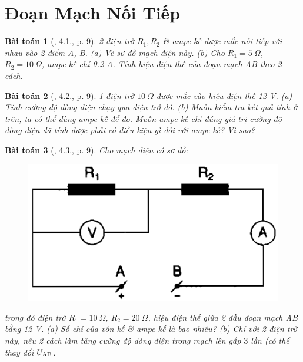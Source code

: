 \documentclass{article}
\newtheorem{baitoan}{Bài toán}
\begin{document}

\section{Đoạn Mạch Nối Tiếp}

\begin{baitoan}[\cite{SBT_Vat_Ly_9}, 4.1., p. 9]
	2 điện trở $R_1,R_2$ \& ampe kế được mắc nối tiếp với nhau vào 2 điểm A, B. (a) Vẽ sơ đồ mạch điện này. (b) Cho $R_1 = 5\ \Omega$, $R_2 = 10\ \Omega$, ampe kế chỉ \emph{0.2 A}. Tính hiệu điện thế của đoạn mạch AB theo 2 cách.
\end{baitoan}

\begin{baitoan}[\cite{SBT_Vat_Ly_9}, 4.2., p. 9]
	1 điện trở $10\ \Omega$ được mắc vào hiệu điện thế \emph{12 V}. (a) Tính cường độ dòng điện chạy qua điện trở đó. (b) Muốn kiểm tra kết quả tính ở trên, ta có thể dùng ampe kế để đo. Muốn ampe kế chỉ đúng giá trị cường độ dòng điện đã tính được phải có điều kiện gì đối với ampe kế? Vì sao?
\end{baitoan}

\begin{baitoan}[\cite{SBT_Vat_Ly_9}, 4.3., p. 9]
	Cho mạch điện có sơ đồ:
	\begin{figure}[H]
		\centering
		\includegraphics[scale=0.25]{SBT_4.1}
	\end{figure}
	\noindent trong đó điện trở $R_1 = 10\ \Omega$, $R_2 = 20\ \Omega$, hiệu điện thế giữa 2 đầu đoạn mạch \emph{AB} bằng \emph{12 V}. (a) Số chỉ của vôn kế \& ampe kế là bao nhiêu? (b) Chỉ với 2 điện trở này, nêu 2 cách làm tăng cường độ dòng điện trong mạch lên gấp $3$ lần (có thể thay đổi $U_{\rm AB}$.
\end{baitoan}
\end{document}
